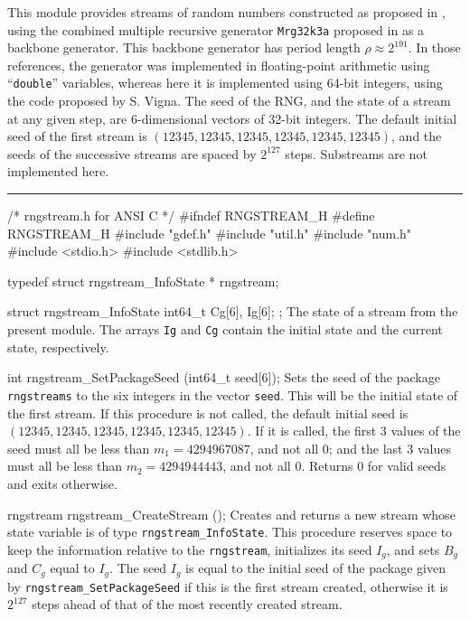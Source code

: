 
This module provides streams of random numbers constructed as proposed in \cite{rLEC02a},
using the combined multiple recursive generator {\tt Mrg32k3a} proposed in \cite{rLEC99b}
as a backbone generator.  This backbone generator has period length $\rho\approx 2^{191}$.
In those references, the generator was implemented in floating-point arithmetic
using ``\texttt{double}'' variables, whereas here it is implemented using 64-bit integers,
using the code proposed by S. Vigna.
The seed of the RNG, and the state of a stream at any given step,
are 6-dimensional vectors of 32-bit integers.
The default initial seed of the first stream is
$(12345, 12345, 12345, 12345, 12345, 12345)$,
and the seeds of the successive streams are spaced by $2^{127}$ steps.
Substreams are not implemented here.


\bigskip\hrule

\code\hide
/* rngstream.h for ANSI C */
#ifndef RNGSTREAM_H
#define RNGSTREAM_H
\endhide
#include "gdef.h"
#include "util.h"
#include "num.h"
#include <stdio.h>
#include <stdlib.h>

typedef struct rngstream_InfoState * rngstream;

struct rngstream_InfoState {
   int64_t Cg[6], Ig[6];
};
\endcode
 \tab
   The state of a stream from the present module.
   The arrays {\tt Ig} and {\tt Cg} contain the initial state
   and the current state, respectively.
 \endtab
\code

int rngstream_SetPackageSeed (int64_t seed[6]);
\endcode
  \tab  Sets the seed of the package {\tt rngstreams} to the
   six integers in the vector {\tt seed}.
   This will be the initial state of the first stream.
   If this procedure is not called, the default initial seed
   is $(12345, 12345, 12345, 12345, 12345, 12345)$.
   If it is called, the first 3 values of the seed must all be
   less than $m_1 = 4294967087$, and not all 0;
   and the last 3 values
   must all be less than $m_2 = 4294944443$, and not all 0.
   Returns 0 for valid seeds and exits otherwise.
 \endtab
\code

rngstream rngstream_CreateStream ();
\endcode
 \tab Creates and returns a new stream
   whose state variable is of type {\tt rngstream\_InfoState}.
   This procedure reserves space to keep the information relative to
   the {\tt rngstream}, initializes its seed $I_g$,
   and sets $B_g$ and $C_g$ equal to $I_g$.
   The seed $I_g$ is equal to the initial seed of the package given by
   {\tt rngstream\_SetPackageSeed} if this is the first stream created,
   otherwise it is $2^{127}$ steps ahead of that of the most recently created stream.
 \endtab
\code

